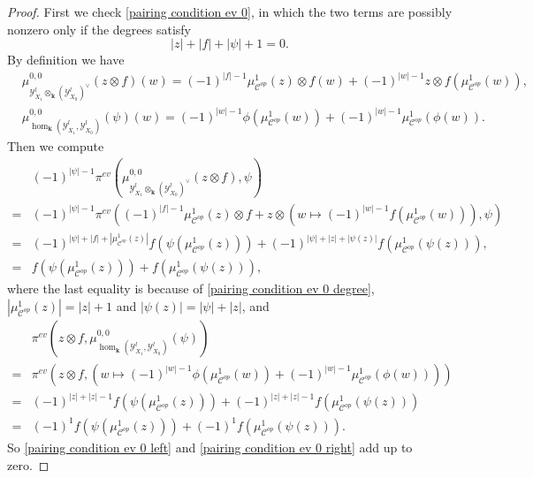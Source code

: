 \documentclass[10pt,a4paper]{amsart}
\def\K{{\mathbf{k}}}
\def\Y{\mathcal{Y}}
\def\cc{\mathcal{C}}
\begin{document}
\begin{proof}
First we check \eqref{pairing condition ev 0},
in which the two terms are possibly nonzero only if the degrees satisfy
\begin{equation}\label{pairing condition ev 0 degree}
|z| + |f| + |\psi| + 1 = 0.
\end{equation}
By definition we have
\begin{align}
& \mu_{\Y^{l}_{X_{1}} \otimes_{\K} (\Y^{l}_{X_{0}})^{\vee}}^{0, 0}(z \otimes f)(w) =   (-1)^{|f| - 1} \mu^{1}_{\cc^{op}}(z) \otimes f(w) + (-1)^{|w| - 1} z \otimes f(\mu^{1}_{\cc^{op}}(w)) , \\
& \mu_{\hom_{\K}(\Y^{l}_{X_{1}}, \Y^{l}_{X_{0}})}^{0, 0}(\psi)(w) = (-1)^{|w|-1} \phi(\mu^{1}_{\cc^{op}}(w)) + (-1)^{ |w| - 1} \mu^{1}_{\cc^{op}}(\phi(w)).
\end{align}
Then we compute
\begin{equation}\label{pairing condition ev 0 left}
\begin{split}
& (-1)^{|\psi|-1} \pi^{ev}(\mu_{\Y^{l}_{X_{1}} \otimes_{\K} (\Y^{l}_{X_{0}})^{\vee}}^{0, 0}(z \otimes f), \psi) \\
= & (-1)^{|\psi|-1} \pi^{ev}((-1)^{|f| - 1} \mu^{1}_{\cc^{op}}(z) \otimes f +  z \otimes (w \mapsto (-1)^{|w| - 1}f(\mu^{1}_{\cc^{op}}(w))), \psi)\\
= & (-1)^{|\psi| + |f| + |\mu^{1}_{\cc^{op}}(z)|}  f(\psi(\mu^{1}_{\cc^{op}}(z))) + (-1)^{|\psi| + |z| + |\psi(z)| } f(\mu^{1}_{\cc^{op}}(\psi(z))) ,\\
= & f(\psi(\mu^{1}_{\cc^{op}}(z))) + f(\mu^{1}_{\cc^{op}}(\psi(z))),
\end{split}
\end{equation}
where the last equality is because of \eqref{pairing condition ev 0 degree}, $|\mu^{1}_{\cc^{op}}(z)| = |z| + 1$ and $|\psi(z)| = |\psi| + |z|$, and 
\begin{equation}\label{pairing condition ev 0 right}
\begin{split}
& \pi^{ev}(z \otimes f, \mu_{\hom_{\K}(\Y^{l}_{X_{1}}, \Y^{l}_{X_{0}})}^{0, 0}(\psi))\\
= & \pi^{ev}(z \otimes f, (w \mapsto (-1)^{|w|-1} \phi(\mu^{1}_{\cc^{op}}(w)) + (-1)^{ |w| - 1} \mu^{1}_{\cc^{op}}(\phi(w)))) \\
= & (-1)^{|z| + |z| - 1} f(\psi(\mu^{1}_{\cc^{op}}(z))) + (-1)^{|z| + |z| - 1} f(\mu^{1}_{\cc^{op}}(\psi(z))) \\
= & (-1)^{1} f(\psi(\mu^{1}_{\cc^{op}}(z)))  + (-1)^{1} f(\mu^{1}_{\cc^{op}}(\psi(z))).
\end{split}
\end{equation}
So \eqref{pairing condition ev 0 left} and \eqref{pairing condition ev 0 right} add up to zero.


\end{proof}
\end{document}
